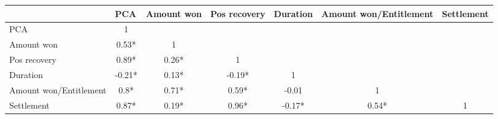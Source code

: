 \begin{tabular}{l|cccccc}
\toprule
\multicolumn{1}{r}{} & \multicolumn{1}{l}{PCA} & \multicolumn{1}{l}{Amount won} & \multicolumn{1}{l}{Pos recovery} & \multicolumn{1}{l}{Duration} & \multicolumn{1}{l}{Amount won/Entitlement } & \multicolumn{1}{l}{Settlement} \\
\midrule
\midrule
PCA   & 1     &       &       &       &       &  \\
Amount won & 0.53* & 1     &       &       &       &  \\
Pos recovery & 0.89* & 0.26* & 1     &       &       &  \\
Duration & -0.21* & 0.13* & -0.19* & 1     &       &  \\
Amount won/Entitlement  & 0.8*  & 0.71* & 0.59* & -0.01 & 1     &  \\
Settlement & 0.87* & 0.19* & 0.96* & -0.17* & 0.54* & 1 \\
\bottomrule
\bottomrule
\end{tabular}%
